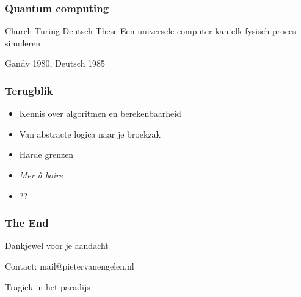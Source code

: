\documentclass[handout]{beamer}
\begin{document}
\begin{frame}{}
    \frametitle{Quantum computing}
    \begin{block}{Church-Turing-Deutsch These}
        Een universele computer kan elk fysisch proces simuleren
        
        {\small Gandy 1980, Deutsch 1985}
    \end{block}

\end{frame}

\begin{frame}{}
    \frametitle{Terugblik}
    \begin{itemize}
        \item<2-> Kennis over algoritmen en berekenbaarheid
        \item<3-> Van abstracte logica naar je broekzak
        \item<4-> Harde grenzen
        \item<5-> \emph{Mer à boire}
        \item<6-> ?? 
    \end{itemize}
\end{frame}

\begin{frame}{}
    \frametitle{The End}

    {\LARGE Dankjewel voor je aandacht}
    
    \vspace{3cm}

    Contact: mail@pietervanengelen.nl
\end{frame}

\begin{frame}
    \begin{center}
        {\LARGE Tragiek in het paradijs}
    \end{center}
\end{frame}
\end{document}
